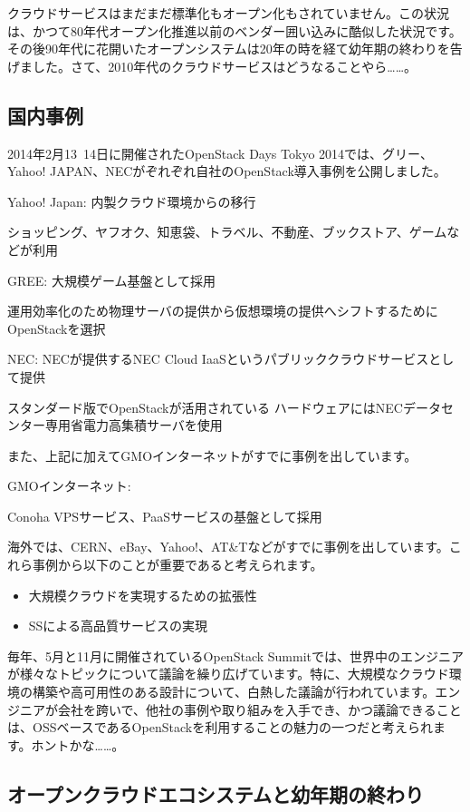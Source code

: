\documentclass[9pt,b5paper,tombo,openany]{jsbook}
\begin{document}
クラウドサービスはまだまだ標準化もオープン化もされていません。この状況は、かつて80年代オープン化推進以前のベンダー囲い込みに酷似した状況です。その後90年代に花開いたオープンシステムは20年の時を経て幼年期の終わりを告げました。さて、2010年代のクラウドサービスはどうなることやら……。

\subsection{国内事例}

2014年2月13~14日に開催されたOpenStack Days Tokyo 2014では、グリー、Yahoo! JAPAN、NECがぞれぞれ自社のOpenStack導入事例を公開しました。

Yahoo! Japan: 内製クラウド環境からの移行

ショッピング、ヤフオク、知恵袋、トラベル、不動産、ブックストア、ゲームなどが利用

GREE: 大規模ゲーム基盤として採用

運用効率化のため物理サーバの提供から仮想環境の提供へシフトするためにOpenStackを選択

NEC: NECが提供するNEC Cloud IaaSというパブリッククラウドサービスとして提供

スタンダード版でOpenStackが活用されている
ハードウェアにはNECデータセンター専用省電力高集積サーバを使用

また、上記に加えてGMOインターネットがすでに事例を出しています。

GMOインターネット:

Conoha VPSサービス、PaaSサービスの基盤として採用

海外では、CERN、eBay、Yahoo!、AT\&Tなどがすでに事例を出しています。これら事例から以下のことが重要であると考えられます。

\begin{itemize}
  \item 大規模クラウドを実現するための拡張性
  \item SSによる高品質サービスの実現
\end{itemize}

毎年、5月と11月に開催されているOpenStack Summitでは、世界中のエンジニアが様々なトピックについて議論を繰り広げています。特に、大規模なクラウド環境の構築や高可用性のある設計について、白熱した議論が行われています。エンジニアが会社を跨いで、他社の事例や取り組みを入手でき、かつ議論できることは、OSSベースであるOpenStackを利用することの魅力の一つだと考えられます。ホントかな……。

\subsection{オープンクラウドエコシステムと幼年期の終わり}
\end{document}
